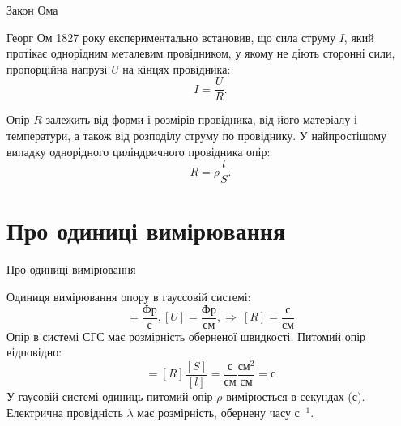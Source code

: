 \documentclass[onlytextwidth]{beamer}
\begin{document}
\begin{frame}{Закон Ома}{}
	\begin{block}{}\justifying
		Георг Ом 1827 року експериментально встановив, що сила струму $I$, який протікає однорідним
		металевим провідником, у якому не діють сторонні сили, пропорційна напрузі $U$ на кінцях
		провідника:
		\begin{equation*}
			I = \frac{U}{R}.
		\end{equation*}
	\end{block}
	\begin{block}{}\justifying
		Опір $R$ залежить від форми і розмірів провідника, від його матеріалу і температури, а також
		від розподілу струму по провіднику. У найпростішому випадку однорідного циліндричного
		провідника опір:
		\begin{equation*}
			R = \rho \frac{l}{S}.
		\end{equation*}
	\end{block}
\end{frame}



\section{Про одиниці вимірювання}


\begin{frame}{Про одиниці вимірювання}{}
	\begin{block}{}\justifying
		Одиниця вимірювання опору в гауссовій системі:
		\begin{equation*}
			[I] = \frac{\text{Фр}}{\text{с}}, [U] = \frac{\text{Фр}}{\text{см}}, \Rightarrow\ [R] =
			\frac{\text{с}}{\text{см}}
		\end{equation*}
		Опір в системі СГС має розмірність оберненої швидкості. Питомий опір відповідно:
		\begin{equation*}
			[\rho] = [R]\frac{[S]}{[l]} = \frac{\text{с}}{\text{см}} \frac{\text{см}^2}{\text{см}}
			= \text{с}
		\end{equation*}
		У гаусовій системі одиниць питомий опір $\rho$ вимірюється в секундах (с).
		Електрична провідність $\lambda$ має розмірність, обернену часу с${^{-1}}$.
	\end{block}
\end{frame}
\end{document}
